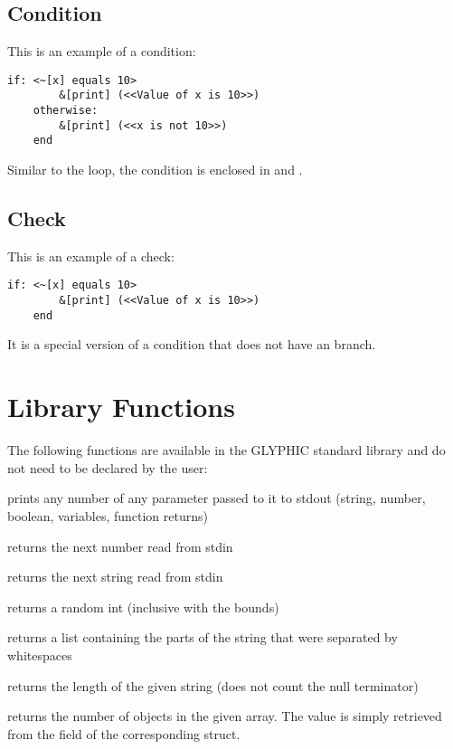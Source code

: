 \subsection{Condition}
This is an example of a condition:

\begin{Verbatim}[commandchars=none, frame=single]
    if: <~[x] equals 10>
        &[print] (<<Value of x is 10>>)
    otherwise:
        &[print] (<<x is not 10>>)
    end
\end{Verbatim}

Similar to the loop, the condition is enclosed in \greybox{<} and \greybox{>}.

\subsection{Check}
This is an example of a check:

\begin{Verbatim}[commandchars=none, frame=single]
    if: <~[x] equals 10>
        &[print] (<<Value of x is 10>>)
    end
\end{Verbatim}

It is a special version of a condition that does not have an  branch.


\section{Library Functions}
The following functions are available in the GLYPHIC standard library and do not need to be declared by the user:

\greybox{\&[print]()} prints any number of any parameter passed to it to stdout (string, number, boolean, variables, function returns)

\greybox{\&[readnum]()} returns the next number read from stdin

\greybox{\&[readstr]()} returns the next string read from stdin

 returns a random int (inclusive with the bounds)

 returns a list containing the parts of the string that were separated by whitespaces

 returns the length of the given string (does not count the null terminator)

 returns the number of objects in the given array. The value is simply retrieved from the field of the corresponding struct.

